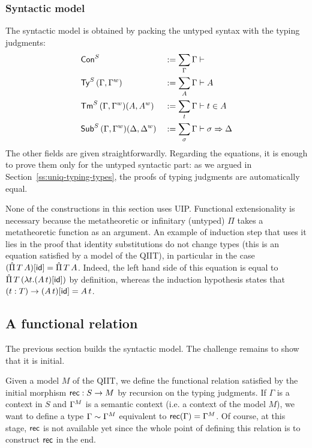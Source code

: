  \subsubsection{Syntactic model}
 The syntactic model is obtained 
 by packing the untyped syntax
with the typing judgments:
\begin{alignat*}{5}
 & {\mathsf{Con}}^S && := \sum_\Gamma \Gamma\vdash
 \\
 & {\mathsf{Ty}}^S \,(\Gamma,{\Gamma}^w)&& := \sum_A \Gamma\vdash A
 \\
 & {\mathsf{Tm}}^S \,(\Gamma,{\Gamma}^w)(A,{A}^w)&& := \sum_t \Gamma\vdash t \in A
 \\
 & {\mathsf{Sub}}^S \,(\Gamma,{\Gamma}^w)(\Delta,{\Delta}^w)&& := \sum_\sigma \Gamma\vdash \sigma \Rightarrow \Delta
\end{alignat*}
The other fields are given straightforwardly.
Regarding the equations, it is enough to prove them only for the untyped syntactic
part: as we argued in Section~\ref{ss:uniq-typing-types}, the proofs of typing judgments are automatically
equal.

None of the constructions in this section uses UIP. Functional extensionality is
 necessary because the metatheoretic or infinitary (untyped) $\Pi$ takes a metatheoretic function
 as an argument. An example of induction step that uses it lies in the proof
 that identity substitutions do not change types (this is an equation satisfied
 by a model of the QIIT), in particular in the case  $(\hat{\Pi}\,T\,
 A)[\mathsf{id}]=\hat{\Pi}\,T\,A$. Indeed, the left hand side of this equation is
 equal to $\hat{\Pi}\,T\,(\lambda t.(A\,t)[\mathsf{id}])$ by definition, whereas the induction hypothesis
 states that $(t:T)\rightarrow (A\,t)[\mathsf{id}]=A\,t$.

\subsection{A functional relation}
The previous section builds the syntactic model.
The challenge remains to show that it is initial.

Given a model $M$ of the QIIT, we define the functional relation satisfied by the initial
morphism $\mathsf{rec} : S\to M$ by recursion on the typing judgments.
If $\Gamma$ is a context in $S$ and ${\Gamma}^M$ is a semantic
context (i.e. a context of the model $M$), we want to define a type $\Gamma\sim {\Gamma}^M$
equivalent to $\mathsf{rec}(\Gamma)={\Gamma}^M$. Of course, at this
stage, $\mathsf{rec}$ is not available yet since the whole point of defining this
relation is to construct $\mathsf{rec}$ in the end.

